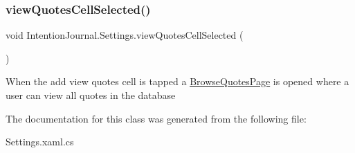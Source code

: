 \subsubsection{\texorpdfstring{view\+Quotes\+Cell\+Selected()}{viewQuotesCellSelected()}}
{\footnotesize\ttfamily void Intention\+Journal.\+Settings.\+view\+Quotes\+Cell\+Selected (\begin{DoxyParamCaption}{ }\end{DoxyParamCaption})\hspace{0.3cm}{\ttfamily [inline]}}



When the add view quotes cell is tapped a \hyperlink{class_intention_journal_1_1_browse_quotes_page}{Browse\+Quotes\+Page} is opened where a user can view all quotes in the database 



The documentation for this class was generated from the following file\+:\begin{DoxyCompactItemize}
\item 
Settings.\+xaml.\+cs\end{DoxyCompactItemize}
